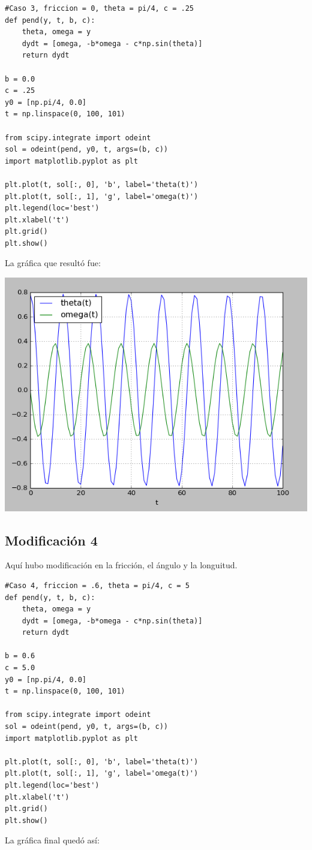\documentclass[12pt,letterpaper]{article}
\begin{document}
\begin{verbatim}
#Caso 3, friccion = 0, theta = pi/4, c = .25
def pend(y, t, b, c):
    theta, omega = y
    dydt = [omega, -b*omega - c*np.sin(theta)]
    return dydt
    
b = 0.0
c = .25
y0 = [np.pi/4, 0.0]
t = np.linspace(0, 100, 101)
    
from scipy.integrate import odeint
sol = odeint(pend, y0, t, args=(b, c))
import matplotlib.pyplot as plt
   
plt.plot(t, sol[:, 0], 'b', label='theta(t)')
plt.plot(t, sol[:, 1], 'g', label='omega(t)')
plt.legend(loc='best')
plt.xlabel('t')
plt.grid()
plt.show()
\end{verbatim}
La gráfica que resultó fue:
\begin{center}
\includegraphics[scale=0.6]{act5caso3.png}
\end{center}

\newpage

\subsection*{Modificación 4}
Aquí hubo modificación en la fricción, el ángulo y la longuitud.

\begin{verbatim}
#Caso 4, friccion = .6, theta = pi/4, c = 5
def pend(y, t, b, c):
    theta, omega = y
    dydt = [omega, -b*omega - c*np.sin(theta)]
    return dydt
    
b = 0.6
c = 5.0
y0 = [np.pi/4, 0.0]
t = np.linspace(0, 100, 101)
    
from scipy.integrate import odeint
sol = odeint(pend, y0, t, args=(b, c))
import matplotlib.pyplot as plt
   
plt.plot(t, sol[:, 0], 'b', label='theta(t)')
plt.plot(t, sol[:, 1], 'g', label='omega(t)')
plt.legend(loc='best')
plt.xlabel('t')
plt.grid()
plt.show()
\end{verbatim}
La gráfica final quedó así:
\end{document}
